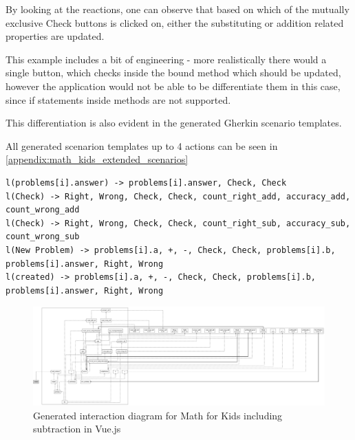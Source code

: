 By looking at the reactions, one can observe that based on which of the mutually exclusive Check buttons is clicked on, either the substituting or addition related properties are updated. 

This example includes a bit of engineering - more realistically there would a single button, which checks inside the bound method which should be updated, however the application would not be able to be differentiate them in this case, since if statements inside methods are not supported.

This differentiation is also evident in the generated Gherkin scenario templates. 

All generated scenarion templates up to 4 actions can be seen in  \ref{appendix:math_kids_extended_scenarios}

\begin{lstlisting}
l(problems[i].answer) -> problems[i].answer, Check, Check
l(Check) -> Right, Wrong, Check, Check, count_right_add, accuracy_add, count_wrong_add
l(Check) -> Right, Wrong, Check, Check, count_right_sub, accuracy_sub, count_wrong_sub
l(New Problem) -> problems[i].a, +, -, Check, Check, problems[i].b, problems[i].answer, Right, Wrong
l(created) -> problems[i].a, +, -, Check, Check, problems[i].b, problems[i].answer, Right, Wrong
\end{lstlisting}

\begin{figure}[H]
    \includegraphics[width=\textwidth]{images/diagram_list_add_sub.png}
     \caption{Generated interaction diagram for Math for Kids including subtraction in Vue.js}
     \label{fig:diagram_list_complex}
\end{figure}








